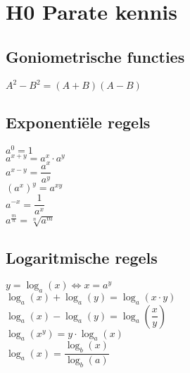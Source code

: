 \section{H0 Parate kennis}
\subsection{Goniometrische functies}
$A^2-B^2=(A+B)(A-B)$\\

\subsection{Exponentiële regels}
$a^0=1$\\
$a^{x+y}=a^x\cdot a^y$\\
$a^{x-y}=\dfrac{a^x}{a^y}$\\
$(a^x)^y=a^{xy}$\\
$a^{-x}=\dfrac{1}{a^x}$\\
$a^{\frac{m}{n}}=\sqrt[n]{a^m}$\\

\subsection{Logaritmische regels}
$y=\log_a(x) \Leftrightarrow x=a^y$\\
$\log_a(x)+\log_a(y)=\log_a(x\cdot y)$\\
$\log_a(x)-\log_a(y)=\log_a\left(\dfrac{x}{y}\right)$\\
$\log_a(x^y)=y\cdot \log_a(x)$\\
$\log_a(x)=\dfrac{\log_b(x)}{\log_b(a)}$\\


